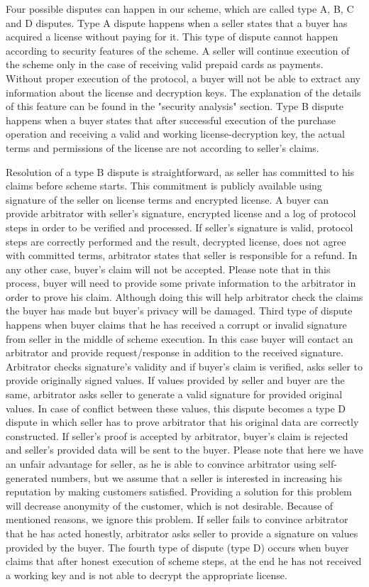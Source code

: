 \documentclass[times]{secauth}
\begin{document}
Four possible disputes can happen in our scheme, which are called type A, B, C and D disputes.
Type A dispute happens when a seller states that a buyer has acquired a license without paying for it. This type of dispute cannot happen according to security features of the scheme. A seller will continue execution of the scheme only in the case of receiving valid prepaid cards as payments. Without proper execution of the protocol, a buyer will not be able to extract any information about the license and decryption keys. The explanation of the details of this feature can be found in the "security analysis" section.
Type B dispute happens when a buyer states that after successful execution of the purchase operation and receiving a valid and working license-decryption key, the actual terms and permissions of the license are not according to seller's claims.

Resolution of a type B dispute is straightforward, as seller has committed to his claims before scheme starts. This commitment is publicly available using signature of the seller on license terms and encrypted license. A buyer can provide arbitrator with seller's signature, encrypted license and a log of protocol steps in order to be verified and processed. If seller's signature is valid, protocol steps are correctly performed and the result, decrypted license, does not agree with committed terms, arbitrator states that seller is responsible for a refund. In any other case, buyer's claim will not be accepted. Please note that in this process, buyer will need to provide some private information to the arbitrator in order to prove his claim. Although doing this will help arbitrator check the claims the buyer has made but buyer's privacy will be damaged.
Third type of dispute happens when buyer claims that he has received a corrupt or invalid signature from seller in the middle of scheme execution. In this case buyer will contact an arbitrator and provide request/response in addition to the received signature. Arbitrator checks signature's validity and if buyer's claim is verified, asks seller to provide originally signed values. If values provided by seller and buyer are the same, arbitrator asks seller to generate a valid signature for provided original values. In case of conflict between these values, this dispute becomes a type D dispute in which seller has to prove arbitrator that his original data are correctly constructed. If seller's proof is accepted by arbitrator, buyer's claim is rejected and seller's provided data will be sent to the buyer. Please note that here we have an unfair advantage for seller, as he is able to convince arbitrator using self-generated numbers, but we assume that a seller is interested in increasing his reputation by making customers satisfied. Providing a solution for this problem will decrease anonymity of the customer, which is not desirable. Because of mentioned reasons, we ignore this problem. If seller fails to convince arbitrator that he has acted honestly, arbitrator asks seller to provide a signature on values provided by the buyer.
The fourth type of dispute (type D) occurs when buyer claims that after honest execution of scheme steps, at the end he has not received a working key and is not able to decrypt the appropriate license.
\end{document}
